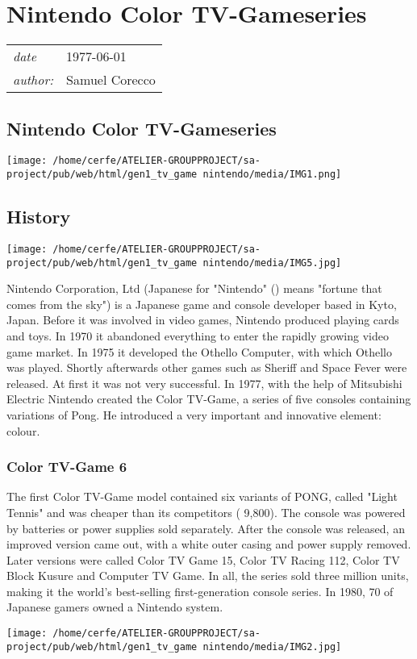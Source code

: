 \documentclass[a4paper,10pt]{book}
\newcommand{\pageHeader}[4]{
    \section{#1}
    \vspace{-0.3cm}
    \begin{table}[h!]
     \begin{tabular}{ll}
        \hline
        \textit{date} & #2 \\
        \textit{author: } & #3\\
        \hline
     \end{tabular}
    \end{table}
    \vspace{-0.3cm}
}
\begin{document}
 
 \newpage\pageHeader{Nintendo Color TV-Gameseries}{1977-06-01}{Samuel Corecco}{A page about the Nintendo Color TV-Gameseries}
 \subsection{Nintendo Color TV-Gameseries }
     
 \texttt{[image: /home/cerfe/ATELIER-GROUPPROJECT/sa-project/pub/web/html/gen1\_tv\_game nintendo/media/IMG1.png]}
 
 
 \subsection{History }
 
 
 \texttt{[image: /home/cerfe/ATELIER-GROUPPROJECT/sa-project/pub/web/html/gen1\_tv\_game nintendo/media/IMG5.jpg]}
 
          Nintendo Corporation, Ltd (Japanese for "Nintendo" () means "fortune that comes from the sky") is a Japanese game and console developer based in Kyto, Japan.
Before it was involved in video games, Nintendo produced playing cards and toys. In 1970 it abandoned everything to enter the rapidly growing video game market. In 1975 it developed the Othello Computer, with which Othello was played. Shortly afterwards other games such as Sheriff and Space Fever were released. At first it was not very successful.
In 1977, with the help of Mitsubishi Electric Nintendo created the Color TV-Game, a series of five consoles containing variations of Pong. He introduced a very important and innovative element: colour.  
 
 \subsubsection{Color TV-Game 6 }
 The first Color TV-Game model contained six variants of PONG, called "Light Tennis" and was cheaper than its competitors ( 9,800). The console was powered by batteries or power supplies sold separately. After the console was released, an improved version came out, with a white outer casing and power supply removed.
Later versions were called Color TV Game 15, Color TV Racing 112, Color TV Block Kusure and Computer TV Game. In all, the series sold three million units, making it the world's best-selling first-generation console series. In 1980, 70 of Japanese gamers owned a Nintendo system.
 
 \texttt{[image: /home/cerfe/ATELIER-GROUPPROJECT/sa-project/pub/web/html/gen1\_tv\_game nintendo/media/IMG2.jpg]}
 
\end{document}
